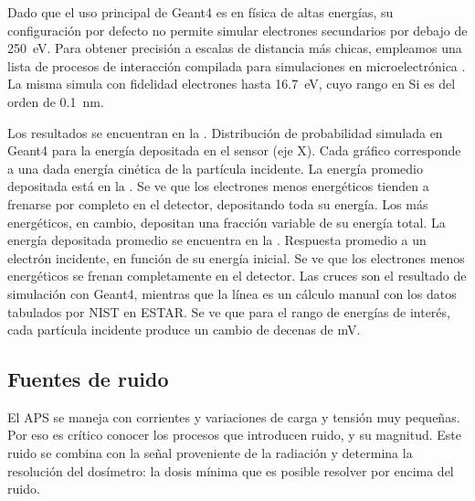 Dado que el uso principal de Geant4 es en física de altas energías,
su configuración por defecto no permite simular electrones secundarios por
debajo de \SI{250}{\electronvolt}.
Para obtener precisión a escalas de distancia más chicas,
empleamos una lista de procesos de interacción 
compilada para simulaciones en microelectrónica \cite{Raine201497}.
La misma simula con fidelidad electrones hasta \SI{16.7}{\electronvolt},
cuyo rango en Si es del orden de \SI{0.1}{\nano\meter}.

Los resultados se encuentran en la .
{Distribución de probabilidad simulada en Geant4 
    para la energía depositada en el sensor (eje X).
Cada gráfico corresponde a una dada energía cinética de la partícula incidente.
La energía promedio depositada está en la .}
Se ve que los electrones menos energéticos tienden a frenarse por completo en
el detector, depositando toda su energía.
Los más energéticos, en cambio, depositan una fracción variable de su energía
total.
La energía depositada promedio se encuentra en la
.
{Respuesta promedio a un electrón incidente,
en función de su energía inicial.
Se ve que los electrones menos energéticos se frenan completamente en el
detector.
Las cruces son el resultado de simulación con Geant4,
mientras que la línea es un cálculo manual 
con los datos tabulados por NIST en ESTAR\cite{berger_estar_????}.}
Se ve que para el rango de energías de interés,
cada partícula incidente produce un cambio de decenas de mV.
\subsection{Fuentes de ruido}
El APS se maneja con corrientes y variaciones de carga y tensión muy
pequeñas.
Por eso es crítico conocer los procesos que introducen ruido, 
y su magnitud.
Este ruido se combina con la señal proveniente de la radiación
y determina la resolución del dosímetro: 
la dosis mínima que es posible resolver por encima del ruido.
